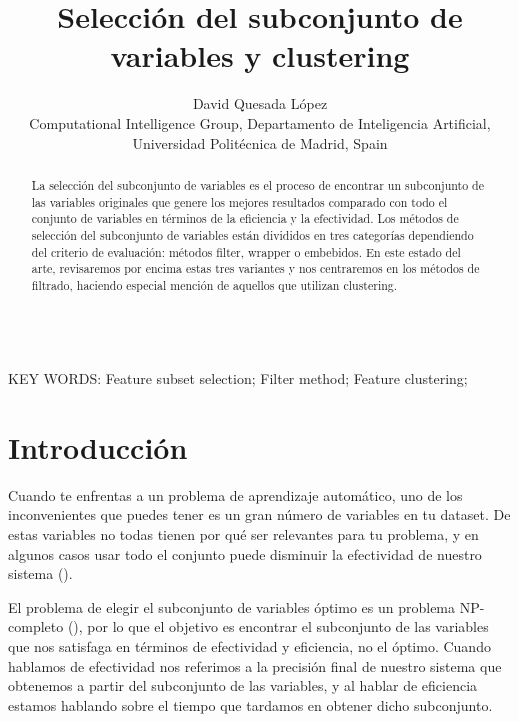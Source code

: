 \documentclass[a4paper,11pt]{article}
\begin{document}
\title{Selección del subconjunto de variables y clustering}

\author{{David Quesada López}\\
{\small Computational Intelligence Group, Departamento de Inteligencia Artificial, Universidad Polit\'ecnica de Madrid, Spain}}

\date{}
\maketitle



\begin{abstract} La selección del subconjunto de variables es el proceso de encontrar un subconjunto de las variables originales que genere los mejores resultados comparado con todo el conjunto de variables en términos de la eficiencia y la efectividad. Los métodos de selección del subconjunto de variables están divididos en tres categorías dependiendo del criterio de evaluación: métodos filter, wrapper o embebidos. En este estado del arte, revisaremos por encima estas tres variantes y nos centraremos en los métodos de filtrado, haciendo especial mención de aquellos que utilizan clustering.
\end{abstract}


\ \\
KEY WORDS: Feature subset selection; Filter method; Feature clustering;




\section{Introducción}

Cuando te enfrentas a un problema de aprendizaje automático, uno de los inconvenientes que puedes tener es un gran número de variables en tu dataset. De estas variables no todas tienen por qué ser relevantes para tu problema, y en algunos casos usar todo el conjunto puede disminuir la efectividad de nuestro sistema (\cite{hliu2011}).

El problema de elegir el subconjunto de variables óptimo es un problema NP-completo (\cite{albrecht1982}), por lo que el objetivo es encontrar el subconjunto de las variables que nos satisfaga en términos de efectividad y eficiencia, no el óptimo. Cuando hablamos de efectividad nos referimos a la precisión final de nuestro sistema que obtenemos a partir del subconjunto de las variables, y al hablar de eficiencia estamos hablando sobre el tiempo que tardamos en obtener dicho subconjunto.
\end{document}

